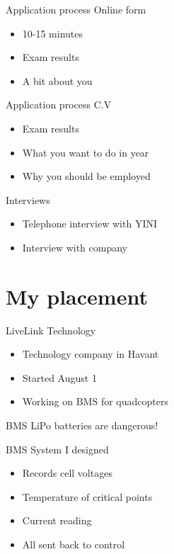 \documentclass{beamer}
\begin{document}
\begin{frame}{Application process}
	Online form
	\begin{itemize}
		\item
			10-15 minutes
		\item
			Exam results
		\item
			A bit about you	
	\end{itemize}
\end{frame}

\begin{frame}{Application process}
	C.V
	\begin{itemize}
		\item
			Exam results
		\item
			What you want to do in year
		\item 
			Why you should be employed
	\end{itemize}
\end{frame}

\begin{frame}{Interviews}
	\begin{itemize}
		\item
			Telephone interview with YINI
		\item 
			Interview with company
	\end{itemize}
\end{frame}

\section{My placement}
\begin{frame}{LiveLink Technology}
	\begin{itemize}
		\item
			Technology company in Havant
		\item
			Started August 1
		\item
			Working on BMS for quadcopters
	\end{itemize}
\end{frame}

\begin{frame}{BMS}
	LiPo batteries are dangerous!
	\centering
\end{frame}

\begin{frame}{BMS}
	System I designed
	\begin{itemize}
		\item
			Records cell voltages
		\item
			Temperature of critical points
		\item 
			Current reading
		\item 
			All sent back to control
	\end{itemize}
\end{frame}
\end{document}
